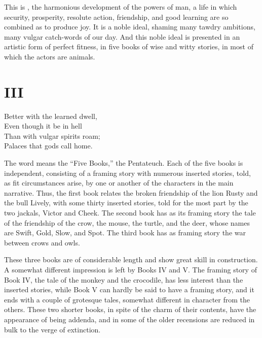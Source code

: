 This is , the harmonious development of the powers of man, a
life in which security, prosperity, resolute action, friendship, and
good learning are so combined as to produce joy. It is a noble ideal,
shaming many tawdry ambitions, many vulgar catch-words of our day. And
this noble ideal is presented in an artistic form of perfect fitness,
in five books of wise and witty stories, in most of which the actors
are animals.

\section{III}
\begin{pverse}
Better with the learned dwell,\\
Even though it be in hell\\
Than with vulgar spirits roam;\\
Palaces that gods call home.
\end{pverse}

The word  means the ``Five Books,'' the Pentateuch. Each of
the five books is independent, consisting of a framing story with
numerous inserted stories, told, as fit circumstances arise, by one or
another of the characters in the main narrative. Thus, the first book
relates the broken friendship of the lion Rusty and the bull Lively,
with some thirty inserted stories, told for the most part by the two
jackals, Victor and Cheek. The second book has as its framing story
the tale of the friendship of the crow, the mouse, the turtle, and the
deer, whose names are Swift, Gold, Slow, and Spot. The third book has
as framing story the war between crows and owls.

These three books are of considerable length and show great skill in
construction. A somewhat different impression is left by Books IV and
V. The framing story of Book IV, the tale of the monkey and the
crocodile, has less interest than the inserted stories, while Book V
can hardly be said to have a framing story, and it ends with a couple
of grotesque tales, somewhat different in character from the others.
These two shorter books, in spite of the charm of their contents, have
the appearance of being addenda, and in some of the older recensions
are reduced in bulk to the verge of extinction.

